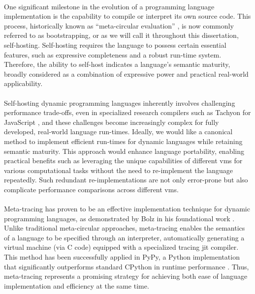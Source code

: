         \paragraph{}%
            One significant milestone in the evolution of a programming language implementation is the capability to compile or interpret its own source code. This process, historically known as “meta-circular evaluation” \cite{sicpbook}, is now commonly referred to as bootstrapping, or as we will call it throughout this dissertation, self-hosting. Self-hosting requires the language to possess certain essential features, such as expressive completeness and a robust run-time system. Therefore, the ability to self-host indicates a language's semantic maturity, broadly considered as a combination of expressive power and practical real-world applicability.

        \paragraph{}%
            Self-hosting dynamic programming languages inherently involves challenging performance trade-offs, even in specialized research compilers such as Tachyon for JavaScript \cite{self-hosted-tachyon}, and these challenges become increasingly complex for fully developed, real-world language run-times. Ideally, we would like a canonical method to implement efficient run-times for dynamic languages while retaining semantic maturity. This approach would enhance language portability, enabling practical benefits such as leveraging the unique capabilities of different \glspl{vm} for various computational tasks without the need to re-implement the language repeatedly. Such redundant re-implementations are not only error-prone but also complicate performance comparisons across different \glspl{vm}.

        \paragraph{}%
            Meta-tracing has proven to be an effective implementation technique for dynamic programming languages, as demonstrated by Bolz in his foundational work \cite{bolzPhDThesis}. Unlike traditional meta-circular approaches, meta-tracing enables the semantics of a language to be specified through an interpreter, automatically generating a virtual machine (via C code) equipped with a specialized tracing \gls{jit} compiler. This method has been successfully applied in PyPy, a Python implementation that significantly outperforms standard CPython in runtime performance \cite{pypy-main}. Thus, meta-tracing represents a promising strategy for achieving both ease of language implementation and efficiency at the same time.

